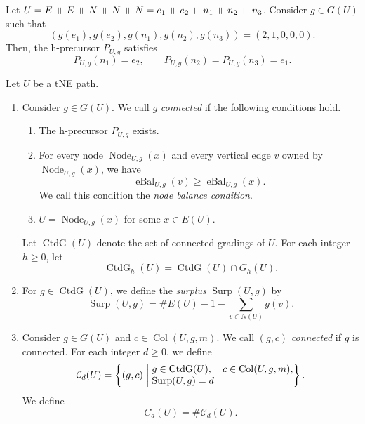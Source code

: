 \begin{example}\label{ex:horizontal-predecessor}
Let $U=E\ccn E\ccn N\ccn N\ccn N=e_1\ccn e_2\ccn n_1\ccn n_2\ccn n_3$.
Consider $g\in G(U)$ such that
\[
 (g(e_1),g(e_2),g(n_1),g(n_2),g(n_3))=(2,1,0,0,0).
\]
Then, the h-precursor $P_{U,g}$ satisfies
\[
 P_{U,g}(n_1)=e_2,\qquad P_{U,g}(n_2)=P_{U,g}(n_3)=e_1.
\]
\end{example}

\begin{definition}\label{def:connected-grading}
Let $U$ be a tNE path.
\begin{enumerate}[font=\itshape]
\item Consider $g\in G(U)$.
We call $g$ \textit{connected} if the following conditions hold.
\begin{enumerate}[font=\itshape]
\item The h-precursor $P_{U,g}$ exists.
\item\label{d:connected-baseline} For every node $\operatorname{Node}_{U,g}(x)$
and every vertical edge $v$ owned by $\operatorname{Node}_{U,g}(x)$, we have
\begin{equation}\label{eq:connected-edge-balance}
 \operatorname{eBal}_{U,g}(v)\ge\operatorname{eBal}_{U,g}(x).
\end{equation}
We call this condition the \textit{node balance condition}.
\item $U=\operatorname{Node}_{U,g}(x)$ for some $x\in E(U)$.
\end{enumerate}
Let $\operatorname{CtdG}(U)$ denote the set of connected gradings of $U$.
For each integer $h\ge0$, let
\[
 \operatorname{CtdG}_h(U)=\operatorname{CtdG}(U)\cap G_h(U).
\]
\item For $g\in\operatorname{CtdG}(U)$, we define the \textit{surplus} $\operatorname{Surp}(U,g)$ by
\begin{equation}\label{eq:residual}
 \operatorname{Surp}(U,g)=\#E(U)-1-\sum_{v\in N(U)}g(v).
\end{equation}
\item Consider $g\in G(U)$ and $c\in\operatorname{Col}(U,g,m)$.
We call $(g,c)$ \textit{connected} if $g$ is connected.
For each integer $d\ge0$, we define
\[
 \mathcal C_d(U)=\left\{(g,c)\;\middle|\;
 \begin{array}{@{}l@{}}
 g\in\operatorname{CtdG}(U),\quad c\in\operatorname{Col}(U,g,m),\\
 \operatorname{Surp}(U,g)=d
 \end{array}\right\}.
\]
We define
\[
 C_d(U)=\#\mathcal C_d(U).
\]
\end{enumerate}
\end{definition}

